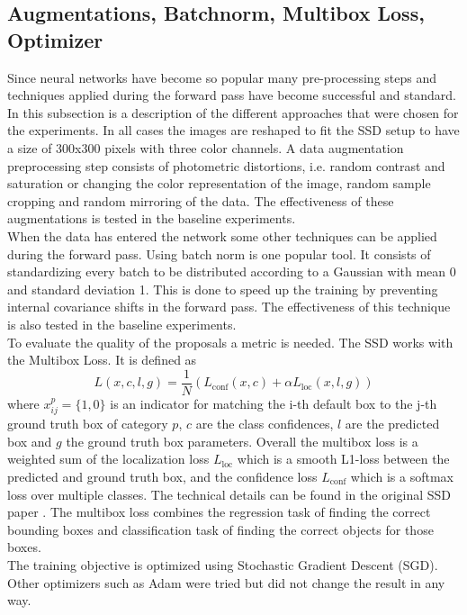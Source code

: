 \subsection{Augmentations, Batchnorm, Multibox Loss, Optimizer} 

Since neural networks have become so popular many pre-processing steps and techniques applied during the forward pass have become successful and standard. In this subsection is a description of the different approaches that were chosen for the experiments. In all cases the images are reshaped to fit the SSD setup to have a size of 300x300 pixels with three color channels. A data augmentation preprocessing step consists of photometric distortions, i.e. random contrast and saturation or changing the color representation of the image, random sample cropping and random mirroring of the data. The effectiveness of these augmentations is tested in the baseline experiments. \\
When the data has entered the network some other techniques can be applied during the forward pass. Using batch norm \cite{BatchNorm} is one popular tool. It consists of standardizing every batch to be distributed according to a Gaussian with mean 0 and standard deviation 1. This is done to speed up the training by preventing internal covariance shifts in the forward pass. The effectiveness of this technique is also tested in the baseline experiments. \\
To evaluate the quality of the proposals a metric is needed. The SSD works with the Multibox Loss. It is defined as 
\begin{equation}
	\label{eq:multibox_loss}
	L(x,c,l,g) = \frac{1}{N}(L_{\text{conf}} (x,c) + \alpha L_{\text{loc}} (x,l,g))
\end{equation}
where $x^p_{ij}=\{1,0\}$ is an indicator for matching the i-th default box to the j-th ground truth box of category $p$, $c$ are the class confidences, $l$ are the predicted box and $g$ the ground truth box parameters. Overall the multibox loss is a weighted sum of the localization loss $L_{\text{loc}}$ which is a smooth L1-loss between the predicted and ground truth box, and the confidence loss $L_{\text{conf}}$ which is a softmax loss over multiple classes. The technical details can be found in the original SSD paper \cite{SSD}. The multibox loss combines the regression task of finding the correct bounding boxes and classification task of finding the correct objects for those boxes. \\
The training objective is optimized using Stochastic Gradient Descent (SGD). Other optimizers such as Adam were tried but did not change the result in any way. 

